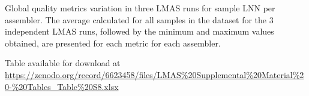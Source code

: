 \begin{table}[]
\centering
\caption{Global quality metrics variation in three LMAS runs for sample LNN per assembler. The average calculated for all samples in the dataset for the 3 independent LMAS runs, followed by the minimum and maximum values obtained, are presented for each metric for each assembler.}
\label{tab:ch5_suptable8}
Table available for download at \url{https://zenodo.org/record/6623458/files/LMAS\%20Supplemental\%20Material\%20-\%20Tables_Table\%20S8.xlsx}
\end{table}